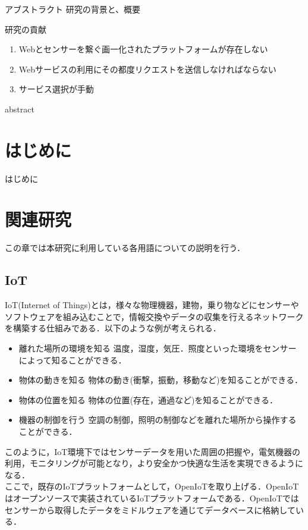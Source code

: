 \documentclass{kuisthesis}			%
\date{平成28年2月6日}				%
\begin{document}
\maketitle					%

\begin{jabstract}				%
アブストラクト
研究の背景と、概要

研究の貢献
\begin{enumerate}
\item
Webとセンサーを繋ぐ画一化されたプラットフォームが存在しない
\item
Webサービスの利用にその都度リクエストを送信しなければならない
\item
サービス選択が手動
\end{enumerate}
\end{jabstract}
\begin{eabstract}				%
abstract

\end{eabstract}

\tableofcontents				%

\section{はじめに}\label{sec-intro}		%
はじめに

\section{関連研究}\label{sec-structure}
この章では本研究に利用している各用語についての説明を行う．

\subsection{IoT}\label{subsec-abstract}
IoT(Internet of Things)とは，様々な物理機器，建物，乗り物などにセンサーやソフトウェアを組み込むことで，情報交換やデータの収集を行えるネットワークを構築する仕組みである．以下のような例が考えられる．
\begin{itemize}
\item 離れた場所の環境を知る
温度，湿度，気圧．照度といった環境をセンサーによって知ることができる．
\item 物体の動きを知る
物体の動き(衝撃，振動，移動など)を知ることができる．
\item 物体の位置を知る
物体の位置(存在，通過など)を知ることができる．
\item 機器の制御を行う
空調の制御，照明の制御などを離れた場所から操作することができる．
\end{itemize}
このように，IoT環境下ではセンサーデータを用いた周囲の把握や，電気機器の利用，モニタリングが可能となり，より安全かつ快適な生活を実現できるようになる．\\
ここで，既存のIoTプラットフォームとして，OpenIoTを取り上げる．OpenIoTはオープンソースで実装されているIoTプラットフォームである．OpenIoTではセンサーから取得したデータをミドルウェアを通じてデータベースに格納している．
\end{document}
